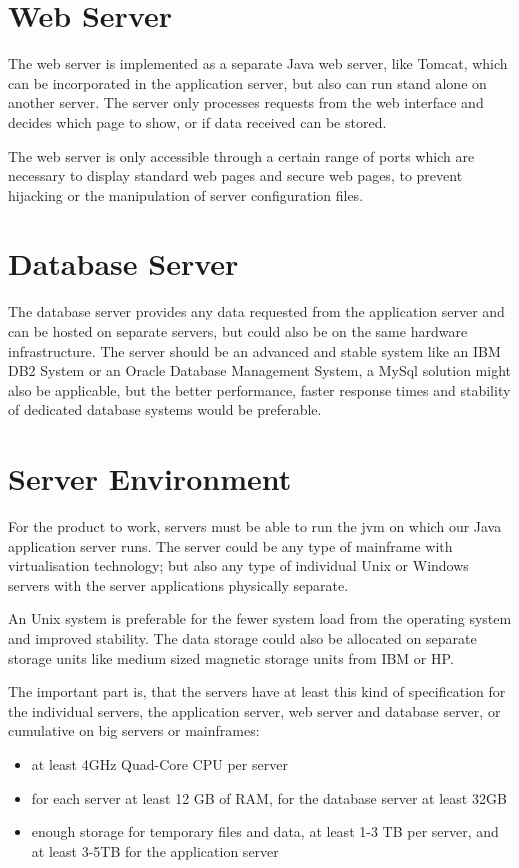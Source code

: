 \documentclass[11pt,a4paper,oneside,svgnames]{report}
\begin{document}
\section{Web Server}
The web server is implemented as a separate Java web server, like Tomcat, which can be incorporated in the application server, but also can run stand alone on another server. The server only processes requests from the web interface and decides which page to show, or if data received can be stored.

The web server is only accessible through a certain range of ports which are necessary to display standard web pages and secure web pages, to prevent hijacking or the manipulation of server configuration files.

\section{Database Server}
The database server provides any data requested from the application server and can be hosted on separate servers, but could also be on the same hardware infrastructure. The server should be an advanced and stable system like an IBM DB2 System or an Oracle Database Management System, a MySql solution might also be applicable, but the better performance, faster response times and stability of dedicated database systems would be preferable.

\section{Server Environment}
For the product to work, servers must be able to run the \gls{jvm} on which our Java application server runs. The server could be any type of mainframe with virtualisation technology; but also any type of individual Unix or Windows servers with the server applications physically separate.

An Unix system is preferable for the fewer system load from the operating system and improved stability. The data storage could also be allocated on separate storage units like medium sized magnetic storage units from IBM or HP.

The important part is, that the servers have at least this kind of specification for the individual servers, the application server, web server and database server, or cumulative on big servers or mainframes:

\begin{itemize}
	\item at least 4GHz Quad-Core CPU per server
	\item for each server at least 12 GB of RAM, for the database server at least 32GB
	\item enough storage for temporary files and data, at least 1-3 TB per server, and at least 3-5TB for the application server
\end{itemize}
\end{document}

